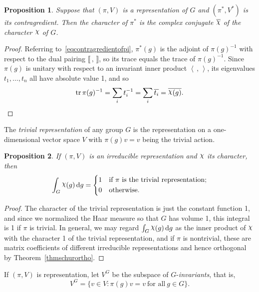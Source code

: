 \documentclass[12pt,reqno]{book}%
\newtheorem{proposition}{Proposition}[chapter]
\theoremstyle{definition}
\theoremstyle{remark}
\theoremstyle{theorem}
\theoremstyle{remark}
\newcommand{\mychi}{\raisebox{2pt}{$\chi$}}
\renewcommand{\d}{\dd}
\begin{document}
\begin{proposition}\label{propcharofcontragredientrepn}%
    Suppose that $(\pi, V)$ is a representation of $G$ and $(\pi^*, V^*)$ is its contragredient.
    Then the character of $\pi^*$ is the complex conjugate $\overline{\mychi}$ of the character $\mychi$ of $G$.
\end{proposition}%
\begin{proof}%
    Referring to~\eqref{eqcontragredientofpi}, $\pi^*(g)$ is the adjoint of ${\pi(g)}^{-1}$ with respect to the dual pairing $\llbracket \, , \, \rrbracket$, so its trace equals the trace of $\pi(g)^{-1}$.
    Since $\pi(g)$ is unitary with respect to an invariant inner product ${\left\langle \, , \, \right\rangle}$, its eigenvalues $t_1, \ldots, t_n$ all have absolute value 1, and so
    \[
        \tr \pi(g)^{-1} = \sum_{i} t_i^{-1} = \sum_{i} \overline{t_i} = \overline{\mychi(g)}.
    \]
\end{proof}%

The \emph{trivial representation} of any group $G$ is the representation on a one-dimensional vector space $V$ with $\pi(g)v = v$ being the trivial action.

\begin{proposition}\label{propintofchar}%
    If $(\pi, V)$ is an irreducible representation and $\mychi$ its character, then
    \[
        \int_{G} \mychi(g) \, \d g =
        \begin{dcases}
            1 & \text{if} \ \pi \ \text{is the trivial representation;} \\
            0 & \text{otherwise.} \ 
        \end{dcases}
    \]
\end{proposition}%
\begin{proof}%
    The character of the trivial representation is just the constant function 1, and since we normalized the Haar measure so that $G$ has volume 1, this integral is 1 if $\pi$ is trivial.
    In general, we may regard $\int_{G} \mychi(g) \, \d g$ as the inner product of $\mychi$ with the character 1 of the trivial representation, and if $\pi$ is nontrivial, these are matrix coefficients of different irreducible representations and hence orthogonal by Theorem~\ref{thmschurortho}.
\end{proof}%

If $(\pi, V)$ is representation, let $V^G$ be the subspace of $G$-\emph{invariants}, that is,
\[
    V^G = \{v \in V : \pi(g)v = v \ \text{for all} \ g \in G\}.
\]
\end{document}
